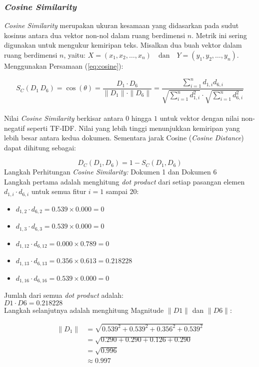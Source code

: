 \documentclass[a4paper,12pt]{report}
\numberwithin{equation}{chapter}
\begin{document}
\subsubsection{\textit{Cosine Similarity}}

\textit{Cosine Similarity} merupakan ukuran kesamaan yang didasarkan pada sudut kosinus antara dua vektor non-nol dalam ruang berdimensi $n$. Metrik ini sering digunakan untuk mengukur kemiripan teks. Misalkan dua buah vektor dalam  ruang berdimensi \(n\), yaitu: $
X = (x_1, x_2, \ldots, x_n) \quad \text{dan} \quad Y = (y_1, y_2, \ldots, y_n)$. Menggunakan Persamaan (\ref{eq:cosine}): 

\[
S_C(D_1\,D_6) = \cos(\theta) = \frac{D_1 \cdot D_6}{\|D_1\| \cdot \|D_6\|} = \frac{\sum_{i=1}^n d_{1,i} d_{6,i}}{\sqrt{\sum_{i=1}^n d_{1,i}^2} \cdot \sqrt{\sum_{i=1}^n d_{6,i}^2}}
\]
\\
Nilai \textit{Cosine Similarity} berkisar antara  $0$ hingga $1$ untuk vektor dengan nilai non-negatif seperti TF-IDF. Nilai yang lebih tinggi menunjukkan kemiripan yang lebih besar antara kedua dokumen. Sementara jarak Cosine (\textit{Cosine Distance}) dapat dihitung sebagai:

\[
D_C(D_1,D_6) = 1 - S_C(D_1,D_6)
\]
Langkah Perhitungan \textit{Cosine Similarity:} Dokumen 1 dan Dokumen 6\\
Langkah pertama adalah menghitung \textit{dot product} dari setiap pasangan elemen $d_{1,i} \cdot d_{6,i}$ untuk semua fitur $i=1$ sampai $20$:
\begin{itemize}
    \item $d_{1,2} \cdot  d_{6,2} = 0.539 \times 0.000 = 0$
    \item $d_{1,3} \cdot d_{6,3} = 0.539 \times 0.000 = 0$
    \item $d_{1,12} \cdot d_{6,12} = 0.000 \times 0.789 = 0$
    \item $d_{1,13} \cdot d_{6,13} = 0.356 \times 0.613 = 0.218228$
    \item $d_{1,16} \cdot d_{6,16} = 0.539 \times 0.000 = 0$
\end{itemize}
Jumlah dari semua \textit{dot product} adalah:\\
$D1 \cdot D6 = 0.218228 $ \\
Langkah selanjutnya adalah menghitung Magnitude $\|D1\|$ dan $\|D6\|$:

\[
\begin{aligned}
\|D_1\| &= \sqrt{0.539^2 + 0.539^2 + 0.356^2 + 0.539^2} \\
       &= \sqrt{0.290 + 0.290 + 0.126 + 0.290} \\
       &= \sqrt{0.996} \\
       &\approx 0.997
\end{aligned}
\]
\end{document}
